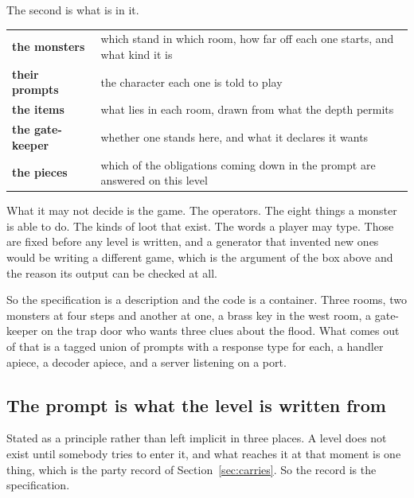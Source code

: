 \documentclass[11pt,a4paper]{article}
\begin{document}
The second is what is in it.

\begin{center}
\begin{tabular}{@{}l@{\hspace{6mm}}>{\raggedright\arraybackslash}p{}@{}}
\toprule
\textbf{the monsters} & which stand in which room, how far off each one starts, and what kind it is \\
\textbf{their prompts}& the character each one is told to play \\
\textbf{the items}    & what lies in each room, drawn from what the depth permits \\
\textbf{the gate-keeper}   & whether one stands here, and what it declares it wants \\
\textbf{the pieces}   & which of the obligations coming down in the prompt are answered on this level \\
\bottomrule
\end{tabular}
\end{center}

What it may not decide is the game. The operators. The eight things a monster is able to do. The
kinds of loot that exist. The words a player may type. Those are fixed before any level is
written, and a generator that invented new ones would be writing a different game, which is the
argument of the box above and the reason its output can be checked at all.

\begin{sectionbox}
So the specification is a description and the code is a container. Three rooms, two monsters at
four steps and another at one, a brass key in the west room, a gate-keeper on the trap door who wants
three clues about the flood. What comes out of that is a tagged union of prompts with a response
type for each, a handler apiece, a decoder apiece, and a server listening on a port.
\end{sectionbox}

\subsection{The prompt is what the level is written from}
\label{sec:written}

Stated as a principle rather than left implicit in three places. A level does not exist until
somebody tries to enter it, and what reaches it at that moment is one thing, which is the party
record of Section~\ref{sec:carries}. So the record is the specification.
\end{document}
